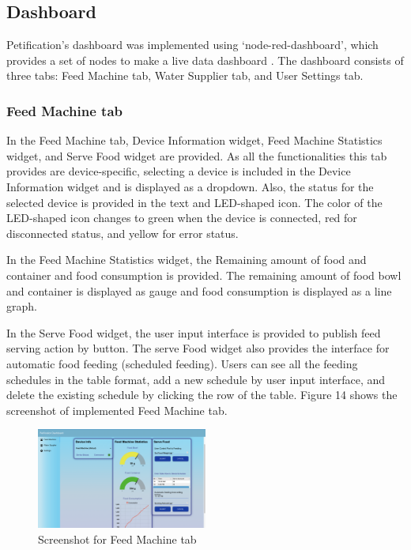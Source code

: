 \documentclass[conference]{IEEEtran}
\begin{document}
\subsection{Dashboard}
Petification’s dashboard was implemented using ‘node-red-dashboard’, which provides a set of nodes to make a live data dashboard \cite{b23}.
The dashboard consists of three tabs: Feed Machine tab, Water Supplier tab, and User Settings tab.

\subsubsection{Feed Machine tab}
In the Feed Machine tab, Device Information widget, Feed Machine Statistics widget, and Serve Food widget are provided. As all the functionalities this tab provides are device-specific, selecting a device is included in the Device Information widget and is displayed as a dropdown.
Also, the status for the selected device is provided in the text and LED-shaped icon. The color of the LED-shaped icon changes to green when the device is connected, red for disconnected status, and yellow for error status.

In the Feed Machine Statistics widget, the Remaining amount of food and container and food consumption is provided. The remaining amount of food bowl and container is displayed as gauge and food consumption is displayed as a line graph.

In the Serve Food widget, the user input interface is provided to publish feed serving action by button. The serve Food widget also provides the interface for automatic food feeding (scheduled feeding). Users can see all the feeding schedules in the table format, add a new schedule by user input interface, and delete the existing schedule by clicking the row of the table. Figure 14 shows the screenshot of implemented Feed Machine tab.

\begin{figure}[htbp]
\centerline{\includegraphics[width=0.5\textwidth]{./images/feed_machine_ui.png}}
\caption{Screenshot for Feed Machine tab}
\label{fig}
\end{figure}
\end{document}
